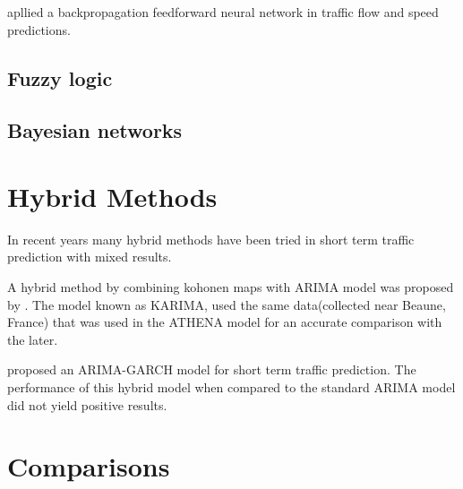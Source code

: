 \cite{dougherty1997short} apllied a backpropagation feedforward neural network in traffic flow
and speed predictions.

\subsection{Fuzzy logic}

\cite{zhang2008short}

\subsection{Bayesian networks}

\cite{castillo2008predicting}


\section{Hybrid Methods}
In recent years many hybrid methods have been tried in short term traffic prediction with mixed
results.

A hybrid method by combining kohonen maps with ARIMA model was proposed by \citet{van1996combining}.
The model known as KARIMA, used the same data(collected near Beaune, France) that was used in the
ATHENA model for an accurate comparison with the later.

\citet{chen2011short} proposed an ARIMA-GARCH model for short term traffic prediction. The
performance of this hybrid model when compared to the standard ARIMA model did not yield positive
results.

\section{Comparisons}
